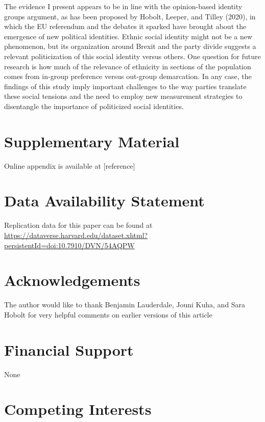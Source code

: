 \documentclass[a4paper]{cupjournal}
\begin{document}
The evidence I present appears to be in line with the opinion-based identity groups argument, as has been proposed by Hobolt, Leeper, and Tilley (2020), in which the EU referendum and the debates it sparked have brought about the emergence of new political identities. Ethnic social identity might not be a new phenomenon, but its organization around Brexit and the party divide suggests a relevant politicization of this social identity versus others. One question for future research is how much of the relevance of ethnicity in sections of the population comes from in-group preference versus out-group demarcation. In any case, the findings of this study imply important challenges to the way parties translate these social tensions and the need to employ new measurement strategies to disentangle the importance of politicized social identities.

\hypertarget{supplementary-material}{%
\section{Supplementary Material}\label{supplementary-material}}

Online appendix is available at {[}reference{]}

\hypertarget{data-availability-statement}{%
\section{Data Availability Statement}\label{data-availability-statement}}

Replication data for this paper can be found at \url{https://dataverse.harvard.edu/dataset.xhtml?persistentId=doi:10.7910/DVN/54AQPW}

\hypertarget{acknowledgements}{%
\section{Acknowledgements}\label{acknowledgements}}

The author would like to thank Benjamin Lauderdale, Jouni Kuha, and Sara Hobolt for very helpful comments on earlier versions of this article

\hypertarget{financial-support}{%
\section{Financial Support}\label{financial-support}}

None

\hypertarget{competing-interests}{%
\section{Competing Interests}\label{competing-interests}}
\end{document}
